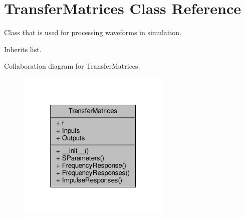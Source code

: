 \hypertarget{classSignalIntegrity_1_1FrequencyDomain_1_1TransferMatrices_1_1TransferMatrices}{}\section{Transfer\+Matrices Class Reference}
\label{classSignalIntegrity_1_1FrequencyDomain_1_1TransferMatrices_1_1TransferMatrices}


Class that is used for processing waveforms in simulation.  




Inherits list.



Collaboration diagram for Transfer\+Matrices\+:
\nopagebreak
\begin{figure}[H]
\begin{center}
\leavevmode
\includegraphics[width=207pt]{classSignalIntegrity_1_1FrequencyDomain_1_1TransferMatrices_1_1TransferMatrices__coll__graph}
\end{center}
\end{figure}
